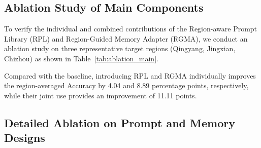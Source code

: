 \documentclass[letterpaper]{article} %
\begin{document}
\subsection{Ablation Study of Main Components}
To verify the individual and combined contributions of the Region-aware Prompt Library (RPL) and Region-Guided Memory Adapter (RGMA), we conduct an ablation study on three representative target regions (Qingyang, Jingxian, Chizhou) as shown in Table~\ref{tab:ablation_main}.

\begin{table}[t]
\centering
\caption{Ablation study of main components on three representative target regions (Qing., Jing., Chiz.) and their average (Avg.).}
\label{tab:ablation_main}
\end{table}

Compared with the baseline, introducing RPL and RGMA individually improves the region-averaged Accuracy by 4.04 and 8.89 percentage points, respectively, while their joint use provides an improvement of 11.11 points.

\subsection{Detailed Ablation on Prompt and Memory Designs}
\end{document}
